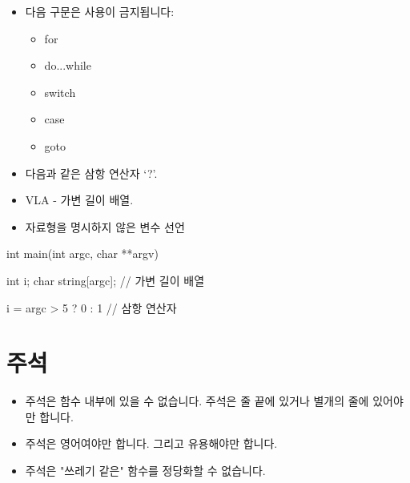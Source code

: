 \documentclass{42-ko}
\begin{document}
        \begin{itemize}

            \item 다음 구문은 사용이 금지됩니다:

                \begin{itemize}

                    \item for
                    \item do...while
                    \item switch
                    \item case
                    \item goto

                \end{itemize}

            \item 다음과 같은 삼항 연산자 `?'.

            \item VLA - 가변 길이 배열.

            \item 자료형을 명시하지 않은 변수 선언

        \end{itemize}
        \begin{42ccode}
    int main(int argc, char **argv)
    {
        int     i;
        char    string[argc]; // 가변 길이 배열

        i = argc > 5 ? 0 : 1 // 삼항 연산자
    }
        \end{42ccode}
        \newpage

    \section{주석}

        \begin{itemize}

            \item 주석은 함수 내부에 있을 수 없습니다. 
                주석은 줄 끝에 있거나 별개의 줄에 있어야만 합니다.

            \item 주석은 영어여야만 합니다. 그리고 유용해야만 합니다.

            \item 주석은 "쓰레기 같은" 함수를 정당화할 수 없습니다.

        \end{itemize}
        \newpage
\end{document}
